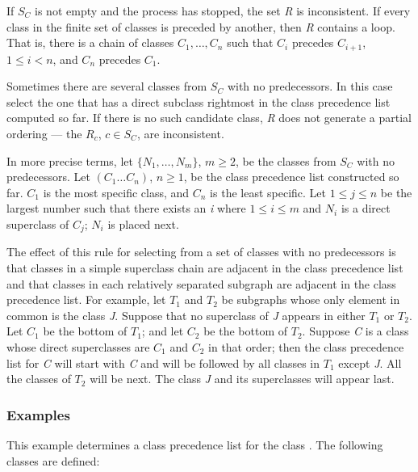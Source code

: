 If $S_{C}$ is not empty and the process has stopped, the set \emph{R} is
inconsistent. If every class in the finite set of classes is preceded
by another, then \emph{R} contains a loop. That is, there is a chain of
classes $C_1,\ldots,C_{n}$
such that $C_{i}$ precedes
$C_{i+1}$, $1\leq i<n$,
and $C_{n}$ precedes $C_1$.

Sometimes there are several classes from $S_{C}$ with no
predecessors.  In this case select the one that has a direct
subclass rightmost in the class precedence list computed so far.
If there is no
such candidate class, \emph{R} does not generate a partial ordering --- the
$R_{c}$, $c\in S_{C}$, are inconsistent.

In more precise terms, let $\{N_1,\ldots,N_{m}\}$,
$m\geq 2$, be
the classes from $S_{C}$ with no predecessors.  Let $(C_1\ldots C_{n})$, $n\geq
1$, be the class precedence list 
constructed so far.  $C_1$ is the most specific class, and $C_n$ is the least
specific.  Let $1\leq j\leq n$ be the largest number 
such that there exists an \emph{i} where $1\leq i\leq m$ and
$N_{i}$
is a direct superclass of $C_{j}$;
$N_{i}$ is placed next.

The effect of this rule for selecting from a set of classes with no
predecessors is that classes in a simple superclass chain are
adjacent in the class precedence list and that classes in each
relatively separated subgraph are adjacent in the class
precedence list. For example, let $T_1$ and $T_2$ be subgraphs
whose only element in common is the class \emph{J}. Suppose
that no superclass of \emph{J} appears in either $T_1$ or $T_2$.
Let $C_1$ be the bottom of $T_1$; and let $C_2$ be the
bottom of $T_2$.  Suppose \emph{C} is a class whose direct superclasses
are $C_1$ and $C_2$ in that order; then the class precedence
list for \emph{C} will start with \emph{C} and will be followed by all classes
in $T_1$ except \emph{J}. All the classes of $T_2$ will be next.
The class \emph{J} and its superclasses will appear last.

\subsubsection{Examples}

This example determines a class precedence list for the
class .  The following classes are defined:

